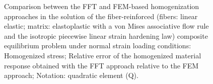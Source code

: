 \begin{figure}[hbt]
\begin{subfigure}[b]{0.49\textwidth}
      \caption{}
      \label{subfig:von_mises_res_mat_small_strain_2D_normal_material_response_error}
    \end{subfigure}
  \caption{Comparison between the FFT and FEM-based homogenization approaches in the solution
  of the fiber-reinforced (fibers: linear elastic; matrix: elastoplastic with a von Mises associative flow rule and the isotropic piecewise linear strain hardening law) composite equilibrium problem under normal strain
  loading conditions:  Homogenized
  stress;  Relative error of the homogenized material response obtained with the FFT approach relative to the FEM approach;
  Notation: quadratic element (Q).}
\label{fig:von_mises_res_mat_small_strain_2D_normal_material_response_and_error}
\end{figure}

